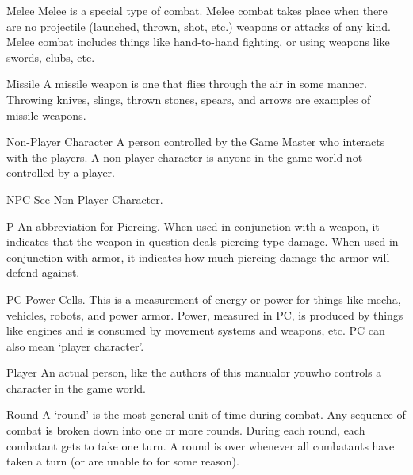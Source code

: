 \documentclass[twoside]{book}
\begin{document}
              
               Melee   
                  Melee is a special type of combat. Melee combat
                 takes place when there are no projectile (launched,
                 thrown, shot, etc.) weapons or attacks of any kind.
                 Melee combat includes things like hand-to-hand fighting,
                 or using weapons like swords, clubs, etc. 
              
              
               Missile   
                  A missile weapon is one that flies through the
                 air in some manner. Throwing knives, slings, thrown
                 stones, spears, and arrows are examples of missile
                 weapons. 
              
              
               Non-Player Character   
                  A person controlled by the Game Master who
                 interacts with the players. A non-player character is
                 anyone in the game world not controlled by a player.
                 
              
              
               NPC   
                See Non Player Character.   
              
              
               P   
                  An abbreviation for Piercing. When used in
                 conjunction with a weapon, it indicates that the weapon
                 in question deals piercing type damage. When used in
                 conjunction with armor, it indicates how much piercing
                 damage the armor will defend against. 
              
              
               PC   
                  Power Cells. This is a measurement of energy or
                 power for things like mecha, vehicles, robots, and power
                 armor. Power, measured in PC, is produced by things like
                 engines and is consumed by movement systems and weapons,
                 etc. PC can also mean `player character'.
                 
              
              
               Player   
                  An actual person, like the authors of this
                 manualor youwho controls a character in
                 the game world. 
              
              
               Round   
                  A `round' is the most general unit of
                 time during combat. Any sequence of combat is broken
                 down into one or more rounds. During each round, each
                 combatant gets to take one turn. A round is over
                 whenever all combatants have taken a turn (or are unable
                 to for some reason). 
              
\end{document}
